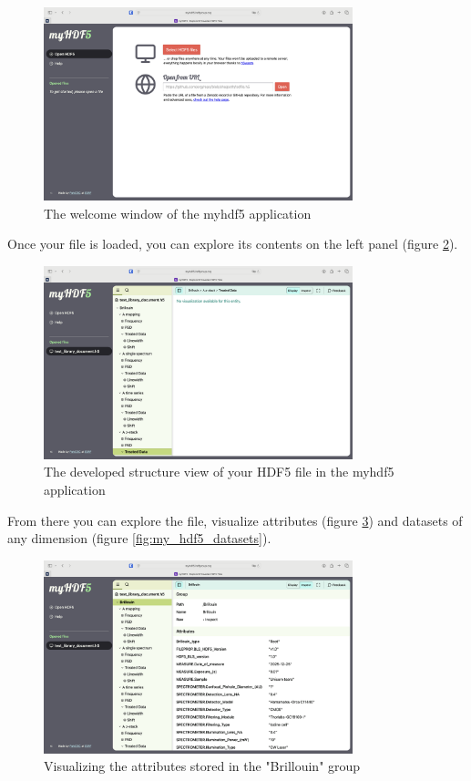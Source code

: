 \documentclass{article}
\begin{document}
\begin{figure}[H]
    \centering
    \includegraphics[width=0.8\textwidth]{img/MyHDF5_welcome_window.png}
    \caption{The welcome window of the myhdf5 application}
    \label{fig:my_hdf5_welcome}
\end{figure}

Once your file is loaded, you can explore its contents on the left panel (figure \ref{fig:my_hdf5_structure}).

\begin{figure}[H]
    \centering
    \includegraphics[width=0.8\textwidth]{img/MyHDF5_Developped structure.png}
    \caption{The developed structure view of your HDF5 file in the myhdf5 application}
    \label{fig:my_hdf5_structure}
\end{figure}

From there you can explore the file, visualize attributes (figure \ref{fig:my_hdf5_attributes}) and datasets of any dimension (figure \ref{fig:my_hdf5_datasets}).

\begin{figure}[H]
    \centering
    \includegraphics[width=0.8\textwidth]{img/My_HDF5_attributes.png}
    \caption{Visualizing the attributes stored in the "Brillouin" group} 
    \label{fig:my_hdf5_attributes}
\end{figure}
\end{document}
